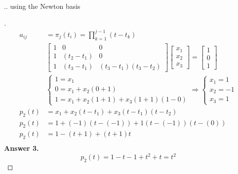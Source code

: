 \documentclass[12pt]{article}
\newenvironment{exercise}[2][Exercise]{\begin{trivlist}
\item[\hskip \labelsep {\bfseries #1}\hskip \labelsep {\bfseries #2.}]}{\end{trivlist}}
\begin{document}
\pagebreak
\begin{exercise}{3}
... using the Newton basis
\end{exercise} \vspace{-10mm}
\begin{proof}[]
	\begin{align*}
		a_{ij} &= \pi_j(t_i) = \prod_{k=1}^{j-1}(t-t_k) \\[10pt]
		& \begin{bmatrix}
			1 & 0 & 0 \\
			1 & (t_2-t_1) & 0 \\
			1 & (t_3-t_1) & (t_3-t_1)(t_3-t_2)	\end{bmatrix}
		\begin{bmatrix}	x_1 \\ x_2 \\ x_3 \end{bmatrix}
		= \begin{bmatrix} 1 \\ 0 \\ 1	\end{bmatrix} \\[10pt]
		& \begin{cases}
			1 = x_1 \\
			0 = x_1 + x_2(0 + 1) \\
			1 = x_1 + x_2(1 + 1) + x_3(1+1)(1-0)
		\end{cases} 
		\Rightarrow \begin{cases} x_1 = 1 \\ x_2 = -1 \\ x_3 = 1 \end{cases}\\[10pt]
		p_{2}(t) &= x_1 + x_2(t - t_1) + x_3(t - t_1)(t - t_2) \\
		p_{2}(t) &= 1 + (-1)(t - (-1)) + 1 (t - (-1))(t - (0)) \\
		p_{2}(t) &= 1 - (t + 1) + (t + 1)t \\
	\end{align*}
	\textbf{Answer 3.} \vspace{-7mm} \\
		\[ p_{2}(t) = 1 - t - 1 + t^2 + t \boxed{= t^2} \]
\end{proof}
\end{document}
